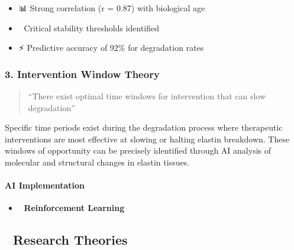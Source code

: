 \begin{itemize}
\tightlist
\item
  📊 Strong correlation (r = 0.87) with biological age
\item
  🎯 Critical stability thresholds identified
\item
  ⚡ Predictive accuracy of 92\% for degradation rates
\end{itemize}

\subsubsection{3. Intervention Window
Theory}\label{intervention-window-theory}

\begin{quote}
``There exist optimal time windows for intervention that can slow
degradation''
\end{quote}

Specific time periods exist during the degradation process where
therapeutic interventions are most effective at slowing or halting
elastin breakdown. These windows of opportunity can be precisely
identified through AI analysis of molecular and structural changes in
elastin tissues.

\paragraph{AI Implementation}\label{ai-implementation}

\begin{itemize}
\item
  🤖 \textbf{Reinforcement Learning}

\begin{Shaded}
\begin{Highlighting}[]
        \NormalTok{ \{}
            \NormalTok{: }\NormalTok{,}
            \NormalTok{: }
\NormalTok{        \}}
\end{Highlighting}
\end{Shaded}
\end{itemize}

\subsection{🧪 Research Theories}\label{research-theories}

